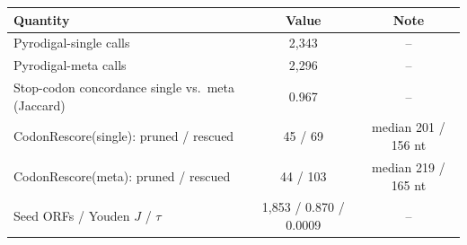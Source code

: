 \begin{tabular}{lcc}
\toprule
Quantity & Value & Note \\
\midrule
Pyrodigal-single calls & 2,343 & -- \\
Pyrodigal-meta calls & 2,296 & -- \\
Stop-codon concordance single vs.\ meta (Jaccard) & 0.967 & -- \\
CodonRescore(single): pruned / rescued & 45 / 69 & median 201 / 156 nt \\
CodonRescore(meta): pruned / rescued & 44 / 103 & median 219 / 165 nt \\
Seed ORFs / Youden $J$ / $\tau$ & 1,853 / 0.870 / 0.0009 & -- \\
\bottomrule
\end{tabular}
